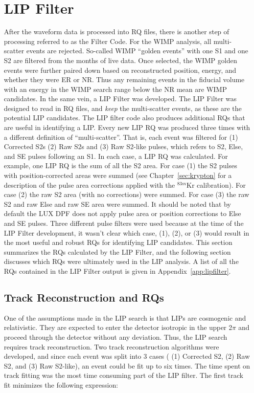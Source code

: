 \section{LIP Filter}
\label{sec:lip_filter}
After the waveform data is processed into \ac{RQ} files, there is another step of processing referred to as the Filter Code. For the \ac{WIMP} analysis, all multi-scatter events are rejected. So-called \ac{WIMP} ``golden events'' with one S1 and one S2 are filtered from the months of live data. Once selected, the \ac{WIMP} golden events were further paired down based on reconstructed position, energy, and whether they were \ac{ER} or \ac{NR}. Thus any remaining events in the fiducial volume with an energy in the \ac{WIMP} search range below the \ac{NR} mean are \ac{WIMP} candidates. In the same vein, a \ac{LIP} Filter was developed. The \ac{LIP} Filter was designed to read in \ac{RQ} files, and \textit{keep} the multi-scatter events, as these are the potential \ac{LIP} candidates. The \ac{LIP} filter code also produces additional \ac{RQ}s that are useful in identifying a \ac{LIP}. Every new \ac{LIP} \ac{RQ} was produced three times with a different definition of ``multi-scatter''. That is, each event was filtered for (1) Corrected S2s (2) Raw S2s and (3) Raw S2-like pulses, which refers to S2, Else, and SE pulses following an S1. In each case, a \ac{LIP} \ac{RQ} was calculated. For example, one \ac{LIP} \ac{RQ} is the sum of all the S2 area. For case (1) the S2 pulses with position-corrected areas were summed (see Chapter~\ref{sec:krypton} for a description of the pulse area corrections applied with the $^{83m}$Kr calibration). For case (2) the raw S2 area (with no corrections) were summed. For case (3) the raw S2 and raw Else and raw SE area were summed. It should be noted that by default the \ac{LUX} \ac{DPF} does not apply pulse area or position corrections to Else and SE pulses. Three different pulse filters were used because at the time of the \ac{LIP} Filter development, it wasn't clear which case, (1), (2), or (3) would result in the most useful and robust \ac{RQ}s for identifying \ac{LIP} candidates. This section summarizes the \ac{RQ}s calculated by the \ac{LIP} Filter, and the following section discusses which \ac{RQ}s were ultimately used in the \ac{LIP} analysis. A list of all the \ac{RQ}s contained in the \ac{LIP} Filter output is given in Appendix~\ref{app:lipfilter}. 

\subsection{Track Reconstruction and RQs}
One of the assumptions made in the \ac{LIP} search is that \ac{LIP}s are cosmogenic and relativistic. They are expected to enter the detector isotropic in the upper 2$\pi$ and proceed through the detector without any deviation. Thus, the \ac{LIP} search requires track reconstruction. Two track reconstruction algorithms were developed, and since each event was split into 3 cases ( (1) Corrected S2, (2) Raw S2, and (3) Raw S2-like), an event could be fit up to six times. The time spent on track fitting was the most time consuming part of the \ac{LIP} filter. The first track fit minimizes the following expression:

